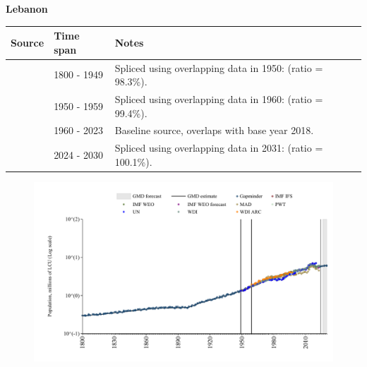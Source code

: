 \documentclass[12pt,a4paper,landscape]{article}
\begin{document}
\begin{adjustbox}{max totalsize={\paperwidth}{\paperheight},center}
\begin{minipage}[t][\textheight][t]{\textwidth}
\vspace*{0.5cm}
{}
\begin{center}
{\Large\bfseries Lebanon}
\end{center}
\vspace{0.5cm}
\begin{table}[H]
\centering
\small
\begin{tabular}{|l|l|l|}
\hline
\textbf{Source} & \textbf{Time span} & \textbf{Notes} \\
\hline
\rowcolor{white}\cite{Gapminder}& 1800 - 1949 &Spliced using overlapping data in 1950: (ratio = 98.3\%).\\
\rowcolor{lightgray}\cite{IMF_IFS}& 1950 - 1959 &Spliced using overlapping data in 1960: (ratio = 99.4\%).\\
\rowcolor{white}\cite{WDI}& 1960 - 2023 &Baseline source, overlaps with base year 2018.\\
\rowcolor{lightgray}\cite{Gapminder}& 2024 - 2030 &Spliced using overlapping data in 2031: (ratio = 100.1\%).\\
\hline
\end{tabular}
\end{table}
\begin{figure}[H]
\centering
\includegraphics[width=\textwidth,height=0.6\textheight,keepaspectratio]{graphs/LBN_pop.pdf}
\end{figure}
\end{minipage}
\end{adjustbox}
\end{document}
